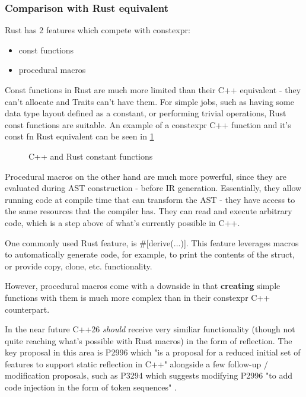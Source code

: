\documentclass[
    english, %
]{VUMIFPSkursinis}
\begin{document}
\subsubsection{Comparison with Rust equivalent}

Rust has 2 features which compete with constexpr:
\begin{itemize}
    \item const functions
    \item procedural macros
\end{itemize}

Const functions in Rust are much more limited than their C++ equivalent - they can't allocate and Traits can't have them. For simple jobs, such as having some data type layout defined as a constant, or performing trivial operations, Rust
const functions are suitable. An example of a constexpr C++ function and it's const fn Rust equivalent can be seen in \cref{fig:constexpr_function}

\begin{figure}[!htbp]
    \begin{minipage}{0.5\textwidth}
        \centering
    \end{minipage}
    \begin{minipage}{0.5\textwidth}
        \centering
    \end{minipage}
    \caption{C++ and Rust constant functions}
    \label{fig:constexpr_function}
\end{figure}

Procedural macros on the other hand are much more powerful, since they are evaluated during AST construction - before IR generation.
Essentially, they allow running code at compile time that can transform the AST - they have access to the same resources that
the compiler has. They can read and execute arbitrary code, which is a step above of what's currently possible in C++.

One commonly used Rust feature, is \#[derive(...)]. This feature leverages macros to automatically generate code,
for example, to print the contents of the struct, or provide copy, clone, etc. functionality.

However, procedural macros come with a downside in that \textbf{creating} simple functions with them is much more complex than in their constexpr C++ counterpart.

In the near future C++26 \textit{should} receive very similiar functionality (though not quite reaching what's possible with Rust macros) in the form of reflection.
The key proposal in this area is P2996 which "is a proposal for a reduced initial set of features to support static reflection in C++" \cite{P2996} alongside a few follow-up / modification proposals, such as P3294 which suggests modifying P2996 "to add code injection in the form of token sequences" \cite{P3294}.
\end{document}
